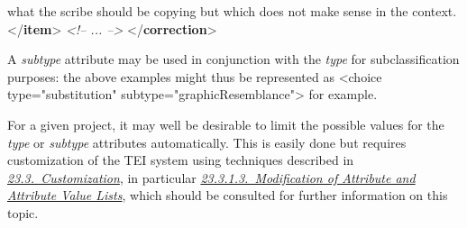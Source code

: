 \begin{shaded}
\hspace*{1em}\hspace*{1em}\hspace*{1em}\hspace*{1em}\hspace*{1em}\hspace*{1em} what the scribe should be copying but which does not make sense in the\mbox{}\newline 
\hspace*{1em}\hspace*{1em}\hspace*{1em}\hspace*{1em}\hspace*{1em}\hspace*{1em} context.{</\textbf{item}>}\mbox{}\newline 
\textit{<!-- ... -->}\mbox{}\newline 
\hspace*{1em}\mbox{}\newline 
{}\mbox{}\newline 
{</\textbf{correction}>}\end{shaded}\egroup\par \noindent  A {\itshape subtype} attribute may be used in conjunction with the {\itshape type} for subclassification purposes: the above examples might thus be represented as <choice type="substitution" subtype="graphicResemblance"> for example.\par
For a given project, it may well be desirable to limit the possible values for the {\itshape type} or {\itshape subtype} attributes automatically. This is easily done but requires customization of the TEI system using techniques described in \textit{\hyperref[MD]{23.3.\ Customization}}, in particular \textit{\hyperref[MDMDAL]{23.3.1.3.\ Modification of Attribute and Attribute Value Lists}}, which should be consulted for further information on this topic.\par
